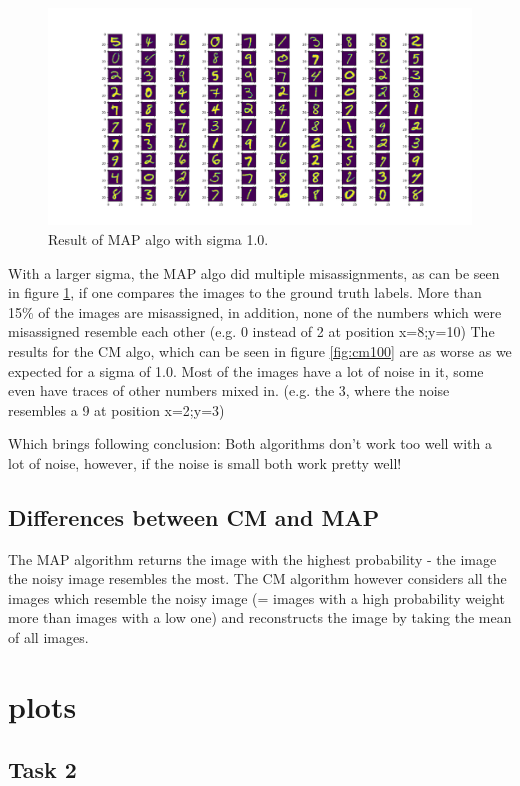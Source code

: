 \documentclass{article}
\begin{document}
\begin{figure}[h]
  \includegraphics[width=\linewidth]{sigma_100_map.png}
  \caption{Result of MAP algo with sigma 1.0.}
  \label{fig:map100}
\end{figure}

With a larger sigma, the MAP algo did multiple misassignments, as can be seen in figure \ref{fig:map100}, if one compares the images to the ground truth labels. More than 15\% of the images are misassigned, in addition, none of the numbers which were misassigned resemble each other (e.g. 0 instead of 2 at position x=8;y=10)
The results for the CM algo, which can be seen in figure \ref{fig:cm100} are as worse as we expected for a sigma of 1.0. Most of the images have a lot of noise in it, some even have traces of other numbers mixed in. (e.g. the 3, where the noise resembles a 9 at position x=2;y=3)

Which brings following conclusion: Both algorithms don't work too well with a lot of noise, however, if the noise is small both work pretty well!
\pagebreak

\subsection{Differences between CM and MAP}
The MAP algorithm returns the image with the highest probability - the image the noisy image resembles the most. The CM algorithm however considers all the images which resemble the noisy image (= images with a high probability weight more than images with a low one) and reconstructs the image by taking the mean of all images.

\clearpage
\section{plots}
\label{plots}
\subsection{Task 2}
\end{document}
